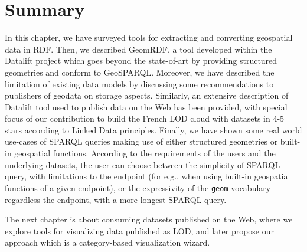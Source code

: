 \section{Summary}
\label{sec:ch2-summary}
In this chapter, we have surveyed tools for extracting and converting geospatial data in RDF. Then, we described GeomRDF, a tool developed within the Datalift project which goes beyond the state-of-art by providing structured geometries and conform to GeoSPARQL. Moreover, we have described the limitation of existing data models by discussing some recommendations to publishers of geodata on storage aspects. Similarly, an extensive description of Datalift tool used to publish data on the Web has been provided, with special focus of our contribution to build the French LOD cloud with datasets in 4-5 stars according to Linked Data principles. Finally, we have shown some real world use-cases of SPARQL queries making use of either structured geometries or built-in geospatial functions. According to the requirements of the users and the underlying datasets, the user can choose between the simplicity of SPARQL query, with limitations to the endpoint (for e.g., when using built-in geospatial functions of a given endpoint), or the expressivity of the \texttt{geom} vocabulary regardless the endpoint, with a more longest SPARQL query.


The next chapter is about consuming datasets published on the Web, where we explore tools for visualizing data published as LOD, and later propose our approach which is a category-based visualization wizard.
